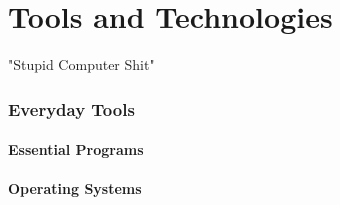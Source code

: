 
\part*{Tools and Technologies}

"Stupid Computer Shit"


\toclineskip
\section{Everyday Tools}


\subsection{Essential Programs}




\subsection{Operating Systems}


